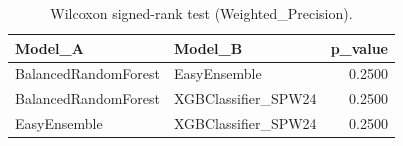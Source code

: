 \begin{table}[t]
\centering
\begin{tabular}{llr}
\toprule
Model_A & Model_B & p_value \\
\midrule
BalancedRandomForest & EasyEnsemble & 0.2500 \\
BalancedRandomForest & XGBClassifier_SPW24 & 0.2500 \\
EasyEnsemble & XGBClassifier_SPW24 & 0.2500 \\
\bottomrule
\end{tabular}
\caption{Wilcoxon signed-rank test (Weighted_Precision).}
\label{tab:wilcoxon_Weighted_Precision}
\end{table}